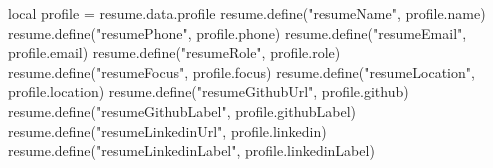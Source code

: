 \begin{luacode*}
local profile = resume.data.profile
resume.define("resumeName", profile.name)
resume.define("resumePhone", profile.phone)
resume.define("resumeEmail", profile.email)
resume.define("resumeRole", profile.role)
resume.define("resumeFocus", profile.focus)
resume.define("resumeLocation", profile.location)
resume.define("resumeGithubUrl", profile.github)
resume.define("resumeGithubLabel", profile.githubLabel)
resume.define("resumeLinkedinUrl", profile.linkedin)
resume.define("resumeLinkedinLabel", profile.linkedinLabel)
\end{luacode*}


